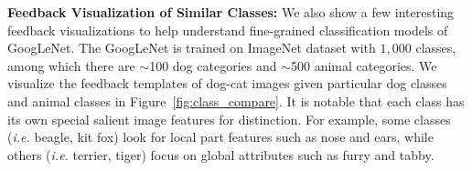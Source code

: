 \textbf{Feedback Visualization of Similar Classes:} We also show a few interesting feedback visualizations to help understand fine-grained classification models of GoogLeNet. The GoogLeNet is trained on ImageNet dataset with $1,000$ classes, among which there are $\sim$100 dog categories and $\sim$500 animal categories. We visualize the feedback templates of dog-cat images given particular dog classes and animal classes in Figure~\ref{fig:class_compare}. It is notable that each class has its own special salient image features for distinction. For example, some classes (\emph{i.e.} beagle, kit fox) look for local part features such as nose and ears, while others (\emph{i.e.} terrier, tiger) focus on global attributes such as furry and tabby.


\setlength{\tabcolsep}{0.5pt}
